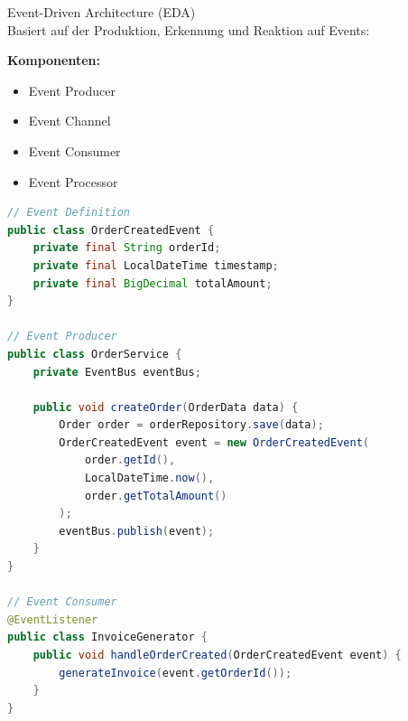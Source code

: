 \begin{concept}{Event-Driven Architecture (EDA)}\\
Basiert auf der Produktion, Erkennung und Reaktion auf Events:

\textbf{Komponenten:}
\begin{itemize}
    \item Event Producer
    \item Event Channel
    \item Event Consumer
    \item Event Processor
\end{itemize}

\begin{lstlisting}[language=Java, style=basesmol]
// Event Definition
public class OrderCreatedEvent {
    private final String orderId;
    private final LocalDateTime timestamp;
    private final BigDecimal totalAmount;
}

// Event Producer
public class OrderService {
    private EventBus eventBus;
    
    public void createOrder(OrderData data) {
        Order order = orderRepository.save(data);
        OrderCreatedEvent event = new OrderCreatedEvent(
            order.getId(),
            LocalDateTime.now(),
            order.getTotalAmount()
        );
        eventBus.publish(event);
    }
}

// Event Consumer
@EventListener
public class InvoiceGenerator {
    public void handleOrderCreated(OrderCreatedEvent event) {
        generateInvoice(event.getOrderId());
    }
}
\end{lstlisting}
\end{concept}

